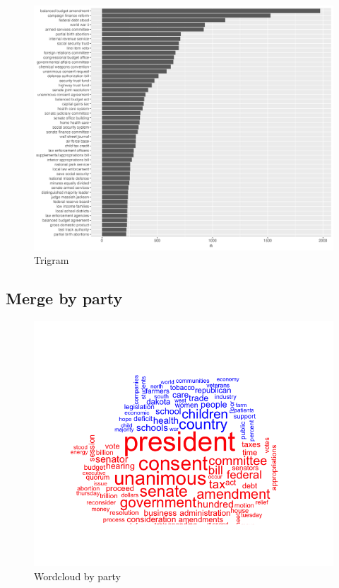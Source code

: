 \documentclass[10pt,leqno]{article}
\begin{document}
\begin{figure}  [h!]
\begin{center}
\caption{Trigram}
\includegraphics[scale=0.4]{3a_trigram_freq.png}
\end{center}
\end{figure}  

\pagebreak

\subsection{Merge by party}

\begin{figure}  [h!]
\begin{center}
\caption{Wordcloud by party}
\includegraphics[scale=0.4]{3b_wordcloud_by_party.png}
\end{center}
\end{figure}  
\end{document}
